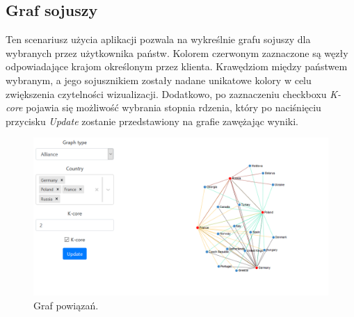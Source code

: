 \subsection{Graf sojuszy}
Ten scenariusz użycia aplikacji pozwala na wykreślnie grafu sojuszy dla wybranych przez użytkownika państw. Kolorem czerwonym zaznaczone są węzły odpowiadające krajom określonym przez klienta. Krawędziom między państwem wybranym, a jego sojusznikiem zostały nadane unikatowe kolory w celu zwiększenia czytelności wizualizacji. Dodatkowo, po zaznaczeniu checkboxu \textit{K-core} pojawia się możliwość wybrania stopnia rdzenia, który po naciśnięciu przycisku \textit{Update} zostanie przedstawiony na grafie zawężając wyniki. 
\begin{figure}[H]
    \centering \includegraphics[width=0.8\linewidth]{tex/alliance.PNG}
    \caption{Graf powiązań.}
    \label{fig:alliance_graph}
\end{figure}